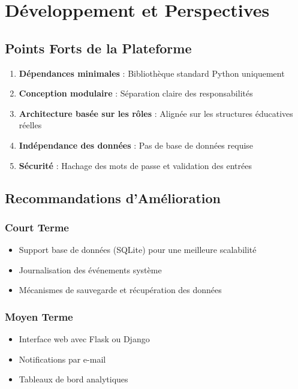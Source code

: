 \documentclass[12pt,a4paper]{article}
\begin{document}
\newpage

\section{Développement et Perspectives}

\subsection{Points Forts de la Plateforme}

\begin{enumerate}
    \item \textbf{Dépendances minimales} : Bibliothèque standard Python uniquement
    \item \textbf{Conception modulaire} : Séparation claire des responsabilités
    \item \textbf{Architecture basée sur les rôles} : Alignée sur les structures éducatives réelles
    \item \textbf{Indépendance des données} : Pas de base de données requise
    \item \textbf{Sécurité} : Hachage des mots de passe et validation des entrées
\end{enumerate}

\subsection{Recommandations d'Amélioration}

\subsubsection{Court Terme}
\begin{itemize}
    \item Support base de données (SQLite) pour une meilleure scalabilité
    \item Journalisation des événements système
    \item Mécanismes de sauvegarde et récupération des données
\end{itemize}

\subsubsection{Moyen Terme}
\begin{itemize}
    \item Interface web avec Flask ou Django
    \item Notifications par e-mail
    \item Tableaux de bord analytiques
\end{itemize}
\end{document}
